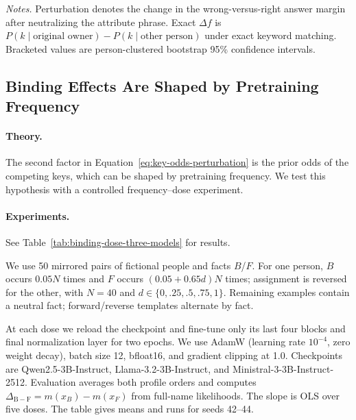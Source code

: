 \begin{table}[t]
\vspace{2pt}
\begin{minipage}{0.98\linewidth}
\footnotesize
\textit{Notes.}
Perturbation denotes the change in the wrong-versus-right answer margin after neutralizing the attribute phrase.
Exact $\Delta f$ is
$P(k\mid\text{original owner})-P(k\mid\text{other person})$
under exact keyword matching.
Bracketed values are person-clustered bootstrap 95\% confidence intervals.
\end{minipage}
\end{table}

\subsection{Binding Effects Are Shaped by Pretraining Frequency}
\paragraph{Theory.}
The second factor in Equation~\ref{eq:key-odds-perturbation} is the prior odds of the competing keys, which can be shaped by pretraining frequency.  We test this hypothesis with a controlled frequency--dose experiment. 
\paragraph{Experiments.}
See Table~\ref{tab:binding-dose-three-models} for results.

We use 50 mirrored pairs of fictional people and facts $B$/$F$. For one person,
$B$ occurs $0.05N$ times and $F$ occurs $(0.05+0.65d)N$ times; assignment is
reversed for the other, with $N=40$ and $d\in\{0,.25,.5,.75,1\}$. Remaining
examples contain a neutral fact; forward/reverse templates alternate by fact.

At each dose we reload the checkpoint and fine-tune only its last four blocks
and final normalization layer for two epochs. We use AdamW (learning rate
$10^{-4}$, zero weight decay), batch size 12, bfloat16, and gradient clipping
at 1.0. Checkpoints are Qwen2.5-3B-Instruct, Llama-3.2-3B-Instruct, and
Ministral-3-3B-Instruct-2512. Evaluation averages both profile orders and
computes $\Delta_{\mathrm{B-F}}=m(x_B)-m(x_F)$ from full-name likelihoods. The
slope is OLS over five doses. The table gives means and runs for seeds 42--44.

